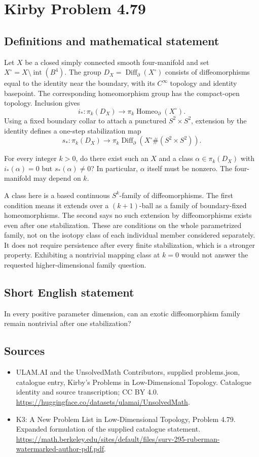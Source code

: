 \documentclass[11pt,a4paper]{article}
\begin{document}
\section*{Kirby Problem 4.79}\label{statement}

\subsection{Definitions and mathematical statement}
Let $X$ be a closed simply connected smooth four-manifold and set $X^\circ=X\setminus\operatorname{int}(B^4)$. The group $D_X=\operatorname{Diff}_\partial(X^\circ)$ consists of diffeomorphisms equal to the identity near the boundary, with its $C^\infty$ topology and identity basepoint. The corresponding homeomorphism group has the compact-open topology. Inclusion gives
\[
i_*:\pi_k(D_X)\to\pi_k\operatorname{Homeo}_\partial(X^\circ).
\]
Using a fixed boundary collar to attach a punctured $S^2\times S^2$, extension by the identity defines a one-step stabilization map
\[
s_*:\pi_k(D_X)\to
\pi_k\operatorname{Diff}_\partial(X^\circ\#(S^2\times S^2)).
\]

For every integer $k>0$, do there exist such an $X$ and a class $\alpha\in\pi_k(D_X)$ with $i_*(\alpha)=0$ but $s_*(\alpha)\ne0$? In particular, $\alpha$ itself must be nonzero. The four-manifold may depend on $k$.

A class here is a based continuous $S^k$-family of diffeomorphisms. The first condition means it extends over a $(k+1)$-ball as a family of boundary-fixed homeomorphisms. The second says no such extension by diffeomorphisms exists even after one stabilization. These are conditions on the whole parametrized family, not on the isotopy class of each individual member considered separately. It does not require persistence after every finite stabilization, which is a stronger property. Exhibiting a nontrivial mapping class at $k=0$ would not answer the requested higher-dimensional family question.
\subsection{Short English statement}
In every positive parameter dimension, can an exotic diffeomorphism family remain nontrivial after one stabilization?
\subsection{Sources}
\begin{itemize}
\item[S1] ULAM.AI and the UnsolvedMath Contributors, supplied problems.json, catalogue entry, Kirby's Problems in Low-Dimensional Topology. Catalogue identity and source transcription; CC BY 4.0.
\url{https://huggingface.co/datasets/ulamai/UnsolvedMath}.
\item[S2] K3: A New Problem List in Low-Dimensional Topology, Problem 4.79. Expanded formulation of the supplied catalogue statement.
\url{https://math.berkeley.edu/sites/default/files/surv-295-ruberman-watermarked-author-pdf.pdf}.
\end{itemize}
\end{document}
